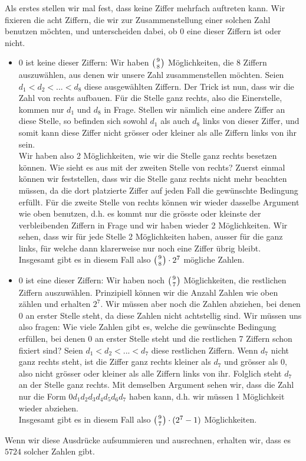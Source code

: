 \documentclass[12pt,a4paper]{article}
\theoremstyle{plain}
\theoremstyle{definition}
\theoremstyle{remark}
\renewcommand{\binom}[2]{\left({#1}\atop{#2}\right)}
\begin{document}
\begin{enumerate}
Als erstes stellen wir mal fest, dass keine Ziffer mehrfach auftreten kann. Wir fixieren die acht Ziffern, die wir zur Zusammenstellung einer solchen Zahl benutzen möchten, und unterscheiden dabei, ob 0 eine dieser Ziffern ist oder nicht.\\
\begin{itemize}
\item 0 ist keine dieser Ziffern: Wir haben $\binom{9}{8}$ Möglichkeiten, die 8 Ziffern auszuwählen, aus denen wir unsere Zahl zusammenstellen möchten. Seien $d_1<d_2<...<d_8$ diese ausgewählten Ziffern. Der Trick ist nun, dass wir die Zahl von rechts aufbauen. Für die Stelle ganz rechts, also die Einerstelle, kommen nur $d_1$ und $d_8$ in Frage. Stellen wir nämlich eine andere Ziffer an diese Stelle, so befinden sich sowohl $d_1$ als auch $d_8$ links von dieser Ziffer, und somit kann diese Ziffer nicht grösser oder kleiner als alle Ziffern links von ihr sein.\\
Wir haben also 2 Möglichkeiten, wie wir die Stelle ganz rechts besetzen können. Wie sieht es aus mit der zweiten Stelle von rechts? Zuerst einmal können wir feststellen, dass wir die Stelle ganz rechts nicht mehr beachten müssen, da die dort platzierte Ziffer auf jeden Fall die gewünschte Bedingung erfüllt. Für die zweite Stelle von rechts können wir wieder dasselbe Argument wie oben benutzen, d.h. es kommt nur die grösste oder kleinste der verbleibenden Ziffern in Frage und wir haben wieder 2 Möglichkeiten. Wir sehen, dass wir für jede Stelle 2 Möglichkeiten haben, ausser für die ganz links, für welche dann klarerweise nur noch eine Ziffer übrig bleibt.\\
Insgesamt gibt es in diesem Fall also $\binom{9}{8}\cdot 2^7$ mögliche Zahlen.\\
\item 0 ist eine dieser Ziffern: Wir haben noch $\binom{9}{7}$ Möglichkeiten, die restlichen Ziffern auszuwählen. Prinzipiell können wir die Anzahl Zahlen wie oben zählen und erhalten $2^7$. Wir müssen aber noch die Zahlen abziehen, bei denen 0 an erster Stelle steht, da diese Zahlen nicht achtstellig sind. Wir müssen uns also fragen: Wie viele Zahlen gibt es, welche die gewünschte Bedingung erfüllen, bei denen 0 an erster Stelle steht und die restlichen 7 Ziffern schon fixiert sind? Seien $d_1<d_2<...<d_7$ diese restlichen Ziffern. Wenn $d_7$ nicht ganz rechts steht, ist die Ziffer ganz rechts kleiner als $d_7$ und grösser als 0, also nicht grösser oder kleiner als alle Ziffern links von ihr. Folglich steht $d_7$ an der Stelle ganz rechts. Mit demselben Argument sehen wir, dass die Zahl nur die Form $0d_1d_2d_3d_4d_5d_6d_7$ haben kann, d.h. wir müssen 1 Möglichkeit wieder abziehen.\\
Insgesamt gibt es in diesem Fall also $\binom{9}{7}\cdot(2^7-1)$ Möglichkeiten.\\
\end{itemize}
Wenn wir diese Ausdrücke aufsummieren und ausrechnen, erhalten wir, dass es $5724$ solcher Zahlen gibt.
\newpage


\end{enumerate}
\end{document}
